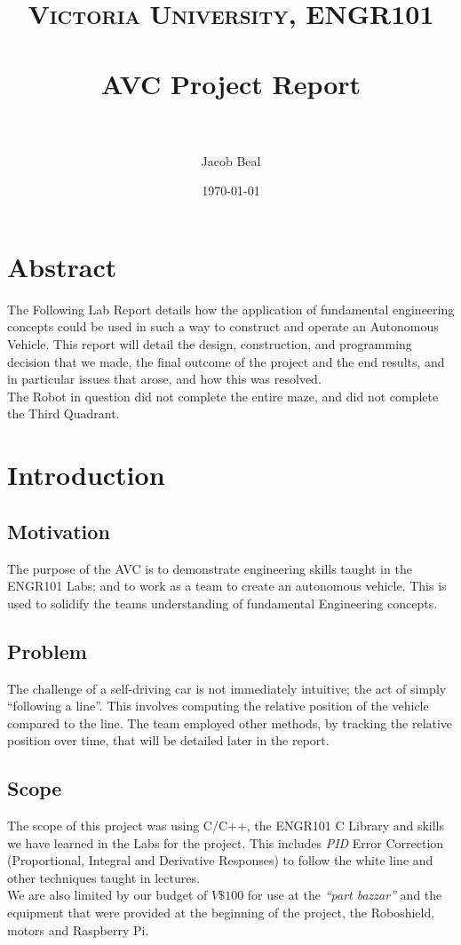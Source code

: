 \documentclass[paper=a4, fontsize=11pt]{scrartcl} %
\title{
\normalfont\normalsize
\textsc{Victoria University, ENGR101} \\ [25pt] %
\horrule{0.5pt} \\[0.4cm] %
\huge AVC Project Report\\ %
\horrule{2pt} \\[0.5cm] %
}
\author{Jacob Beal} %
\date{\normalsize\today} %
\numberwithin{equation}{section} %
\numberwithin{figure}{section} %
\begin{document}
\maketitle
\tableofcontents
\section{Abstract}
The Following Lab Report details how the application of fundamental engineering
concepts could be used in such a way to construct and operate an Autonomous
Vehicle. This report will detail the design, construction, and programming
decision that we made, the final outcome of the project and the end results,
and in particular issues that arose, and how this was resolved.\\

The Robot in question did not complete the entire maze, and did not complete the
Third Quadrant.
\section{Introduction}
\subsection{Motivation}
The purpose of the AVC is to demonstrate engineering skills taught in the
ENGR101 Labs; and to work as a team to create an autonomous vehicle. This is
used to solidify the teams understanding of fundamental Engineering concepts.
\subsection{Problem}
The challenge of a self-driving car is not immediately intuitive; the act of %
simply ``following a line''. This involves computing the relative position of
the vehicle compared to the line. The team employed other methods, by tracking
the relative position over time, that will be detailed later in the report.
\subsection{Scope}
The scope of this project was using C/C++, the ENGR101 C Library and skills we
have learned in the Labs for the project. This includes \textit{PID} Error
Correction (Proportional, Integral and Derivative Responses) to follow the 
white line and other techniques taught in lectures.\\
We are also limited by our budget of $V\$100$ for use at the \textit{``part
  bazzar''} and the equipment that were provided at the beginning of the
project, the Roboshield, motors and Raspberry Pi.
\end{document}
